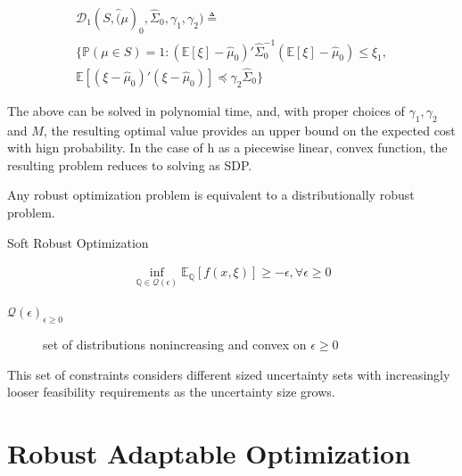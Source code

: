 \documentclass{beamer}
\begin{document}
\begin{frame}{}
\begin{align*}
\mathcal{D}_{1}(S, \hat(\mu)_{0}, \hat{\Sigma}_{0}, \gamma_{1}, \gamma_{2}) \triangleq \\
\{\mathbb{P}(\mu \in S) = 1 : (\mathbb{E}[\xi] - \hat{\mu}_{0})'\hat{\Sigma}_{0}^{-1}(\mathbb{E}[\xi] - \hat{\mu}_{0}) \leq \xi_{1}, \\
\mathbb{E}[(\xi - \hat{\mu}_{0})'(\xi - \hat{\mu}_{0})] \preceq \gamma_{2}\hat{\Sigma}_{0} \}
\end{align*}

The above can be solved in polynomial time, and, with proper choices of $\gamma_{1}, \gamma_{2}$ and $M$, the resulting optimal value provides an upper bound on the expected cost with hign probability.
In the case of h as a piecewise linear, convex function, the resulting problem reduces to solving as SDP.

\end{frame}

\begin{frame}{}
Any robust optimization problem is equivalent to a distributionally robust problem.
\end{frame}

\begin{frame}{Soft Robust Optimization}
\begin{block}{}
\begin{align*}
\inf_{\mathbb{Q} \in \mathcal{Q}(\epsilon)} \mathbb{E_{\mathbb{Q}}} [f(x,\xi)] \geq -\epsilon, \forall \epsilon \geq 0
\end{align*}
\begin{description}
\item [${\mathcal{Q}(\epsilon)}_{\epsilon \geq 0}$] set of distributions nonincreasing and convex on $\epsilon \geq 0$ 
\end{description}
This set of constraints considers different sized uncertainty sets with increasingly looser feasibility requirements as the uncertainty size grows.
\end{block}
\end{frame}

\section{Robust Adaptable Optimization}
\end{document}
